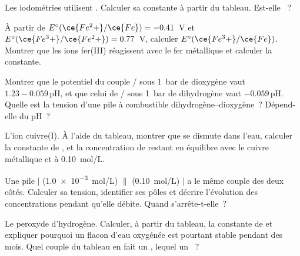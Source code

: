 \begin{exercise}[$\star\star$]\label{exo:b1:nernst:7}
Les iodométries utilisent . Calculer
sa constante à partir du tableau. Est-elle ~?
\end{exercise}

\begin{exercise}[$\star\star$]\label{exo:b1:nernst:8}
À partir de $E^\circ(\ce{Fe^2+}/\ce{Fe}) = -0.41$~V et
$E^\circ(\ce{Fe^3+}/\ce{Fe^2+})
= 0.77$~V, calculer $E^\circ(\ce{Fe^3+}/\ce{Fe})$. Montrer que les ions
fer(III) réagissent avec le fer métallique et calculer la constante.
\end{exercise}

\begin{exercise}[$\star\star$]\label{exo:b1:nernst:9}
Montrer que le potentiel du couple / sous \qty{1}{bar}
de dioxygène vaut $1.23 - 0.059\,\mathrm{pH}$, et que celui de
/ sous \qty{1}{bar} de dihydrogène vaut
$-0.059\,\mathrm{pH}$. Quelle est la tension d'une pile à combustible
dihydrogène--dioxygène~? Dépend-elle du pH~?
\end{exercise}

\begin{exercise}[$\star\star\star$]\label{exo:b1:nernst:10}
L'ion cuivre(I). À l'aide du tableau, montrer que  se dismute
dans l'eau, calculer la constante de , et la
concentration de  restant en équilibre avec le cuivre métallique
et  à \qty{0.10}{mol/L}.
\end{exercise}

\begin{exercise}[$\star\star\star$]\label{exo:b1:nernst:11}
Une pile  $|$  (\qty{1.0e-3}{mol/L}) $\|$ 
(\qty{0.10}{mol/L}) $|$  a le même couple des deux côtés.
Calculer sa tension, identifier ses pôles et décrire l'évolution des
concentrations pendant qu'elle débite. Quand s'arrête-t-elle~?
\end{exercise}

\begin{exercise}[$\star\star\star$]\label{exo:b1:nernst:12}
Le peroxyde d'hydrogène. Calculer, à partir du tableau, la constante de
 et expliquer pourquoi un flacon d'eau oxygénée
est pourtant stable pendant des mois. Quel couple du tableau en fait un
, lequel un ~?
\end{exercise}

